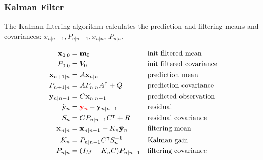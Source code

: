 \begin{frame}
    \frametitle{Kalman Filter}

The Kalman filtering algorithm calculates the prediction and filtering means and
    covariances: $x_{n|n-1}, P_{n|n-1}, x_{n|n}, .P_{n|n}$,

\scriptsize
\begin{alignat*}{2}
    \mathbf{x}_{0|0}&=\mathbf{m}_0&&\text{init filtered mean}\\
    P_{0|0}&=V_0&&\text{init filtered covariance}\\
    \mathbf{x}_{n+1|n}&=A\mathbf{x}_{n|n}\quad&&\text{prediction mean}\\
    P_{n+1|n}&=AP_{n|n}A^\intercal+Q\quad&&\text{prediction covariance}\\
    \mathbf{y}_{n|n-1}&=C\mathbf{x}_{n|n-1}\quad&&\text{predicted observation}\\
    \tilde{\mathbf{y}}_n&=\textcolor{red}{\mathbf{y}_n}-\mathbf{y}_{n|n-1}\quad&&\text{residual}\\
    S_n&=CP_{n|n-1}C^\intercal+R\quad&&\text{residual covariance}\\
    \mathbf{x}_{n|n}&=\mathbf{x}_{n|n-1}+K_n\tilde{\mathbf{y}}_n\quad&&\text{filtering mean}\\
    K_n&=P_{n|n-1}C^\intercal S_n^{-1}&&\text{Kalman gain}\\
    P_{n|n}&=(I_M-K_nC)P_{n|n-1}&&\text{filtering covariance}
\end{alignat*}
\normalsize

\end{frame}

